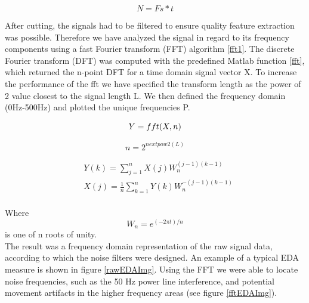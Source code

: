 \begin{equation}\label{NumberSamples}
N = Fs * t
\end{equation} 

After cutting, the signals had to be filtered to ensure quality feature extraction was possible. Therefore we have analyzed the signal in regard to its frequency components using a fast Fourier transform (FFT) algorithm \ref{fft1}. The discrete Fourier transform (DFT) was computed with the predefined Matlab function \ref{fft}, which returned the n-point DFT for a time domain signal vector X. To increase the performance of the fft we have specified the transform length as the power of 2 value closest to the signal length L. We then defined the frequency domain (0Hz-500Hz) and plotted the unique frequencies P.

\begin{equation}\label{fft}
Y = fft(X,n) \\
\end{equation}

\begin{equation}
n = 2^{nextpow2(L)}
\end{equation}

\begin{align}\label{fft1}
& Y(k) = \sum\limits_{j=1}^n X(j) W_{n}^{(j-1)(k-1)} \\
& X(j) = \frac{1}{n} \sum\limits_{k=1}^n Y(k) W_{n}^{-(j-1)(k-1)} \\
\end{align} 

Where
\begin{equation}
W_{n} = e^{(-2\pi t)/n}
\end{equation}
is one of n roots of unity.\\

The result was a frequency domain representation of the raw signal data, according to which the noise filters were designed. An example of a typical EDA measure is shown in figure \ref{rawEDAImg}. Using the FFT we were able to locate noise frequencies, such as the 50 Hz power line interference, and potential movement artifacts in the higher frequency areas (see figure \ref{fftEDAImg}).

